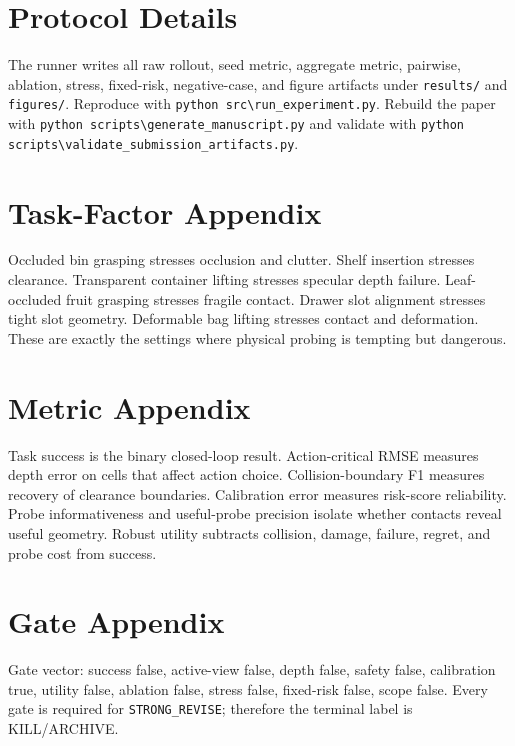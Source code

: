 \documentclass{article}
\newcommand{\terminal}{\textsc{KILL/ARCHIVE}}
\begin{document}
\clearpage
\appendix
\section{Protocol Details}
The runner writes all raw rollout, seed metric, aggregate metric, pairwise, ablation, stress, fixed-risk, negative-case, and figure artifacts under \texttt{results/} and \texttt{figures/}. Reproduce with \texttt{python src\textbackslash run\_experiment.py}. Rebuild the paper with \texttt{python scripts\textbackslash generate\_manuscript.py} and validate with \texttt{python scripts\textbackslash validate\_submission\_artifacts.py}.

\section{Task-Factor Appendix}
Occluded bin grasping stresses occlusion and clutter. Shelf insertion stresses clearance. Transparent container lifting stresses specular depth failure. Leaf-occluded fruit grasping stresses fragile contact. Drawer slot alignment stresses tight slot geometry. Deformable bag lifting stresses contact and deformation. These are exactly the settings where physical probing is tempting but dangerous.

\section{Metric Appendix}
Task success is the binary closed-loop result. Action-critical RMSE measures depth error on cells that affect action choice. Collision-boundary F1 measures recovery of clearance boundaries. Calibration error measures risk-score reliability. Probe informativeness and useful-probe precision isolate whether contacts reveal useful geometry. Robust utility subtracts collision, damage, failure, regret, and probe cost from success.

\section{Gate Appendix}
Gate vector: success false, active-view false, depth false, safety false, calibration true, utility false, ablation false, stress false, fixed-risk false, scope false. Every gate is required for \texttt{STRONG\_REVISE}; therefore the terminal label is \terminal{}.
\end{document}
